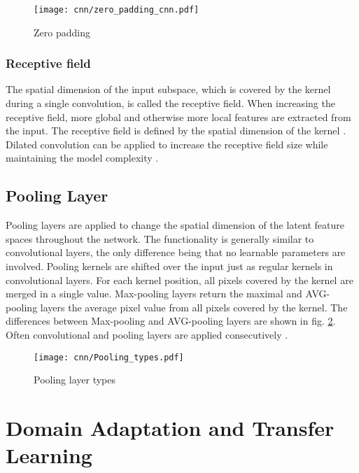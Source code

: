 \begin{figure}[H]
  \centering
  \texttt{[image: cnn/zero\_padding\_cnn.pdf]}
  \caption {Zero padding}
  \label{fig:zero_padding_cnn}
\end{figure}

\subsubsection{Receptive field}
The spatial dimension of the input subspace, which is covered by the kernel during a single convolution, is called the receptive field. When increasing the receptive field, more global and otherwise more local features are extracted from the input. The receptive field is defined by the spatial dimension of the kernel \cite{OShea2015}. Dilated convolution can be applied to increase the receptive field size while maintaining the model complexity \cite{Dai2017}. 

\subsection{Pooling Layer}
Pooling layers are applied to change the spatial dimension of the latent feature spaces throughout the network. The functionality is generally similar to convolutional layers, the only difference being that no learnable parameters are involved. Pooling kernels are shifted over the input just as regular kernels in convolutional layers. For each kernel position, all pixels covered by the kernel are merged in a single value. Max-pooling layers return the maximal and AVG-pooling layers the average pixel value from all pixels covered by the kernel. The differences between Max-pooling and AVG-pooling layers are shown in fig. \ref{fig:Pooling_types}. Often convolutional and pooling layers are applied consecutively \cite{OShea2015}.

\begin{figure}[H]
  \centering
  \texttt{[image: cnn/Pooling\_types.pdf]}
  \caption {Pooling layer types}
  \label{fig:Pooling_types}
\end{figure}

\section{Domain Adaptation and Transfer Learning}

